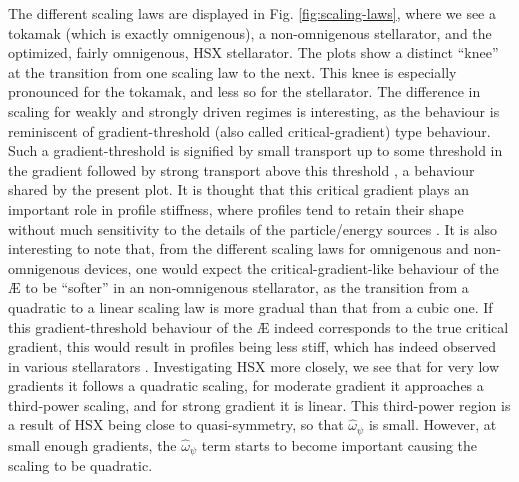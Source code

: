 The different scaling laws are displayed in Fig. \ref{fig:scaling-laws}, where we see a tokamak (which is exactly omnigenous), a non-omnigenous stellarator, and the optimized, fairly omnigenous, HSX stellarator. The plots show a distinct ``knee'' at the transition from one scaling law to the next. This knee is especially pronounced for the tokamak, and less so for the stellarator. The difference in scaling for weakly and strongly driven regimes is interesting, as the behaviour is reminiscent of gradient-threshold (also called critical-gradient) type behaviour. Such a gradient-threshold is signified by small transport up to some threshold in the gradient followed by strong transport above this threshold \citep{Dimits2000ComparisonsSimulations}, a behaviour shared by the present plot. It is thought that this critical gradient plays an important role in profile stiffness, where profiles tend to retain their shape without much sensitivity to the details of the particle/energy sources \citep{garbet2004profile}. It is also interesting to note that, from the different scaling laws for omnigenous and non-omnigenous devices, one would expect the critical-gradient-like behaviour of the \AE{} to be ``softer'' in an non-omnigenous stellarator, as the transition from a quadratic to a linear scaling law is more gradual than that from a cubic one. If this gradient-threshold behaviour of the \AE{} indeed corresponds to the true critical gradient, this would result in profiles being less stiff, which has indeed observed in various stellarators \citep{milligen2008quantifying,sanchez2015self}. Investigating HSX more closely, we see that for very low gradients it follows a quadratic scaling, for moderate gradient it approaches a third-power scaling, and for strong gradient it is linear. This third-power region is a result of HSX being close to quasi-symmetry, so that $\hat{\omega}_\psi$ is small. However, at small enough gradients, the $\hat{\omega}_\psi$ term starts to become important causing the scaling to be quadratic. 
\par 
